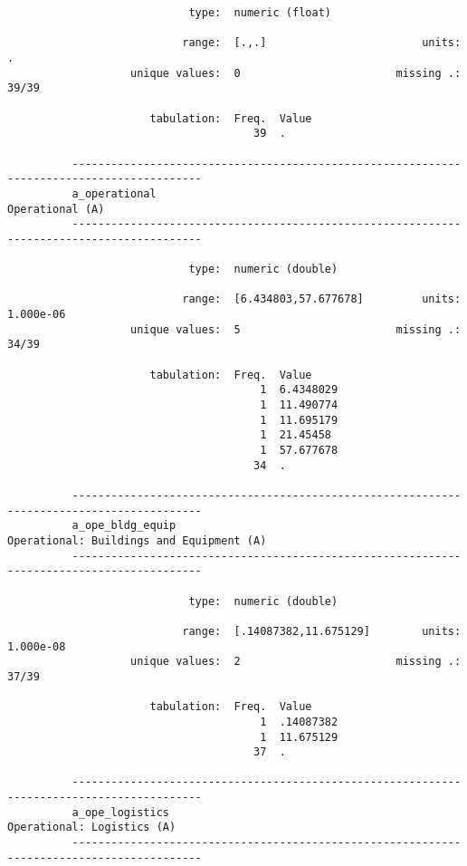 \documentclass{article}
\begin{document}
\begin{verbatim}
                            type:  numeric (float)
          
                           range:  [.,.]                        units:  .
                   unique values:  0                        missing .:  39/39
          
                      tabulation:  Freq.  Value
                                      39  .
          
          ------------------------------------------------------------------------------------------
          a_operational                                                              Operational (A)
          ------------------------------------------------------------------------------------------
          
                            type:  numeric (double)
          
                           range:  [6.434803,57.677678]         units:  1.000e-06
                   unique values:  5                        missing .:  34/39
          
                      tabulation:  Freq.  Value
                                       1  6.4348029
                                       1  11.490774
                                       1  11.695179
                                       1  21.45458
                                       1  57.677678
                                      34  .
          
          ------------------------------------------------------------------------------------------
          a_ope_bldg_equip                                  Operational: Buildings and Equipment (A)
          ------------------------------------------------------------------------------------------
          
                            type:  numeric (double)
          
                           range:  [.14087382,11.675129]        units:  1.000e-08
                   unique values:  2                        missing .:  37/39
          
                      tabulation:  Freq.  Value
                                       1  .14087382
                                       1  11.675129
                                      37  .
          
          ------------------------------------------------------------------------------------------
          a_ope_logistics                                                 Operational: Logistics (A)
          ------------------------------------------------------------------------------------------
          

\end{verbatim}
\end{document}
